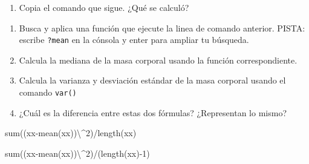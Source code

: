 \documentclass[
  letterpaper,
  DIV=11,
  numbers=noendperiod]{scrartcl}
\newenvironment{Shaded}{\begin{snugshade}}{\end{snugshade}}
\newcommand{\AttributeTok}[1]{\textcolor[rgb]{0.40,0.45,0.13}{#1}}
\newcommand{\DecValTok}[1]{\textcolor[rgb]{0.68,0.00,0.00}{#1}}
\newcommand{\FunctionTok}[1]{\textcolor[rgb]{0.28,0.35,0.67}{#1}}
\newcommand{\NormalTok}[1]{\textcolor[rgb]{0.00,0.23,0.31}{#1}}
\newcommand{\OtherTok}[1]{\textcolor[rgb]{0.00,0.23,0.31}{#1}}
\newcommand{\SpecialCharTok}[1]{\textcolor[rgb]{0.37,0.37,0.37}{#1}}
\providecommand{\tightlist}{%
  \setlength{\itemsep}{0pt}\setlength{\parskip}{0pt}}\usepackage{longtable,booktabs,array}
\begin{document}
\begin{enumerate}
\def\labelenumi{\arabic{enumi}.}
\tightlist
\item
  Copia el comando que sigue. ¿Qué se calculó?
\end{enumerate}

\begin{Shaded}
\end{Shaded}

\begin{enumerate}
\def\labelenumi{\arabic{enumi}.}
\setcounter{enumi}{1}
\item
  Busca y aplica una función que ejecute la linea de comando anterior.
  PISTA: escribe \texttt{?mean} en la cónsola y enter para ampliar tu
  búsqueda.
\item
  Calcula la mediana de la masa corporal usando la función
  correspondiente.
\item
  Calcula la varianza y desviación estándar de la masa corporal usando
  el comando \texttt{var()}
\item
  ¿Cuál es la diferencia entre estas dos fórmulas? ¿Representan lo
  mismo?
\end{enumerate}

\begin{Shaded}
\begin{Highlighting}[]
\FunctionTok{sum}\NormalTok{((xx}\SpecialCharTok{{-}}\FunctionTok{mean}\NormalTok{(xx))\textbackslash{}}\SpecialCharTok{\^{}}\DecValTok{2}\NormalTok{)}\SpecialCharTok{/}\FunctionTok{length}\NormalTok{(xx)}

\FunctionTok{sum}\NormalTok{((xx}\SpecialCharTok{{-}}\FunctionTok{mean}\NormalTok{(xx))\textbackslash{}}\SpecialCharTok{\^{}}\DecValTok{2}\NormalTok{)}\SpecialCharTok{/}\NormalTok{(}\FunctionTok{length}\NormalTok{(xx)}\SpecialCharTok{{-}}\DecValTok{1}\NormalTok{)}
\end{Highlighting}
\end{Shaded}
\end{document}
